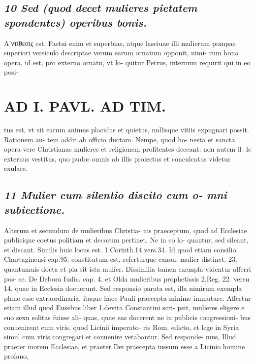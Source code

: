 \documentclass{article}
\begin{document}
\begin{pages}
\subsection*{\textit{10 Sed (quod decet mulieres pietatem spondentes) operibus bonis. }}\pstart A'ντίθεσις est. Fastui enim et superbiae, atque lasciuae illi mulierum pompae superiori versiculo descriptae verum earum ornatum opponit, nimi- rum bona opera, id est, pro externo ornatu, vt lo- quitur Petrus, internum requirit qui in eo posi-  \pend
\section*{AD I. PAVL. AD TIM. }
\marginpar{[ p.82 ]}\pstart tus est, vt sit earum animus placidus et quietus, nullisque vitiis expugnari possit. Rationem au- tem addit ab officio ductam. Nempe, quod ho- nesta et sancta opera vere Christianas mulieres et religionem profitentes deceant: non autem il- le externus vestitus, quo pudor omnis ab illis proiectus et conculcatus videtur exulare.  \pend
{}
{}
\subsection*{\textit{11 Mulier cum silentio discito cum o- mni subiectione. }}\pstart Alterum et secundum de mulieribus Christia- nis praeceptum, quod ad Ecclesiae publicique coetus politiam et decorum pertinet, Ne in eo lo- quantur, sed sileant, et discant. Similis huic locus est. 1.Corinth.14.vers.34. Id quod etiam consilio Chartaginensi cap.95. constitutum est, referturque  canon. mulier distinct. 23. quantumuis docta et pia sit ista mulier.  \pend\pstart Dissimilia tamen exempla videntur afferri pos- se. De Debora Iudic. cap. 4. et Olda mulieribus prophetissis 2.Reg. 22. versu 14. quae in Ecclesia docuerunt. Sed responsio parata est, illa nimirum exempla plane esse extraordinaria, itaque haec Pauli praecepta minime immutare. Affertur etiam illud quod Eusebus liber  1.devita Constantini scri- psit, mulieres eligere e suo sexu solitas fuisse ali- quas, quae eas docerent ne in publicis congressioni- bus conuenirent cum viris, quod Licinii imperato- ris Rom. edicto, et lege in Syria simul cum viris congregari et conuenire vetabantur. Sed responde- mus, Illud praeter morem Ecclesiae, et praeter Dei praecepta iussum esse a Licinio homine profano,  \pend

\end{pages}
\end{document}
